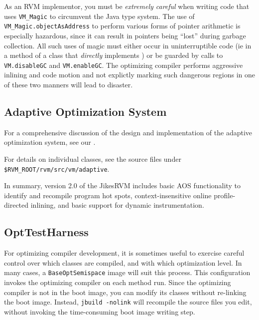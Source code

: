 As an RVM implementor, you must be {\em extremely careful} when writing
code that uses {\tt VM\_Magic} to circumvent the Java type
system. The use of {\tt VM\_Magic.objectAsAddress} to perform various
forms of pointer arithmetic is especially hazardous, since it can
result in pointers being ``lost'' during garbage collection. 
All such uses of magic must either occur in uninterruptible
code (ie in a method of a class that {\em directly} implements 
) or be guarded by calls to 
{\tt VM.disableGC} and {\tt VM.enableGC}.  The optimizing compiler
performs aggressive inlining and code motion and not explictly marking
such dangerous regions in one of these two manners will lead to
disaster.

\JavaTMFooter

\subsection{Adaptive Optimization System}\label{section:aosdetails}

For a comprehensive discussion of the design and implementation of the
adaptive optimization system, see our 
. 

For details on individual classes, see the source files under 
{\tt \$RVM\_ROOT/rvm/src/vm/adaptive}.

In summary, version 2.0 of the Jikes\trademark RVM includes basic AOS
functionality to identify and recompile program hot spots,
context-insensitive online profile-directed inlining, and basic
support for dynamic instrumentation. 

\JikesTMFooter

\subsection{OptTestHarness}\label{opttestharness}

For optimizing compiler development, it is sometimes useful to exercise
careful control over which classes are compiled, and with which
optimization level.  In many cases, a {\tt BaseOptSemispace} image will
suit this process.  This configuration invokes the optimizing compiler on
each method run.  Since the optimizing compiler is not in the boot image, 
you can modify its classes without re-linking the boot image.  Instead,
{\tt jbuild -nolink} will recompile the source files you edit, without
invoking the time-consuming boot image writing step.

